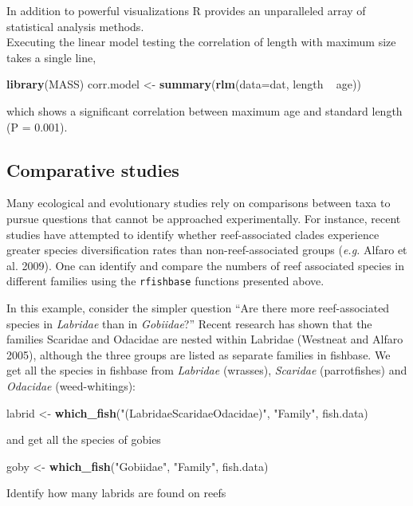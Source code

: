 \documentclass[author-year]{elsarticle} %
\newenvironment{Shaded}{}{}
\newcommand{\KeywordTok}[1]{\textcolor[rgb]{0.00,0.44,0.13}{\textbf{{#1}}}}
\newcommand{\DataTypeTok}[1]{\textcolor[rgb]{0.56,0.13,0.00}{{#1}}}
\newcommand{\StringTok}[1]{\textcolor[rgb]{0.25,0.44,0.63}{{#1}}}
\newcommand{\NormalTok}[1]{{#1}}
\begin{document}
In addition to powerful visualizations R provides an unparalleled array
of statistical analysis methods.\\Executing the linear model testing the
correlation of length with maximum size takes a single line,

\begin{Shaded}
\begin{Highlighting}[]
\KeywordTok{library}\NormalTok{(MASS)}
\NormalTok{corr.model <- }\KeywordTok{summary}\NormalTok{(}\KeywordTok{rlm}\NormalTok{(}\DataTypeTok{data=}\NormalTok{dat,  length ~ age))}
\end{Highlighting}
\end{Shaded}
which shows a significant correlation between maximum age and standard
length (P = 0.001).

\subsection{Comparative studies}

Many ecological and evolutionary studies rely on comparisons between
taxa to pursue questions that cannot be approached experimentally. For
instance, recent studies have attempted to identify whether
reef-associated clades experience greater species diversification rates
than non-reef-associated groups (\emph{e.g.} Alfaro et al. 2009). One
can identify and compare the numbers of reef associated species in
different families using the \texttt{rfishbase} functions presented
above.

In this example, consider the simpler question ``Are there more
reef-associated species in \emph{Labridae} than in \emph{Gobiidae}?''
Recent research has shown that the families Scaridae and Odacidae are
nested within Labridae (Westneat and Alfaro 2005), although the three
groups are listed as separate families in fishbase. We get all the
species in fishbase from \emph{Labridae} (wrasses), \emph{Scaridae}
(parrotfishes) and \emph{Odacidae} (weed-whitings):

\begin{Shaded}
\begin{Highlighting}[]
\NormalTok{labrid <- }\KeywordTok{which_fish}\NormalTok{(}\StringTok{"(Labridae\textbar{}Scaridae\textbar{}Odacidae)"}\NormalTok{, }\StringTok{"Family"}\NormalTok{, fish.data)}
\end{Highlighting}
\end{Shaded}
and get all the species of gobies

\begin{Shaded}
\begin{Highlighting}[]
\NormalTok{goby <- }\KeywordTok{which_fish}\NormalTok{(}\StringTok{"Gobiidae"}\NormalTok{, }\StringTok{"Family"}\NormalTok{, fish.data)}
\end{Highlighting}
\end{Shaded}
Identify how many labrids are found on reefs
\end{document}
